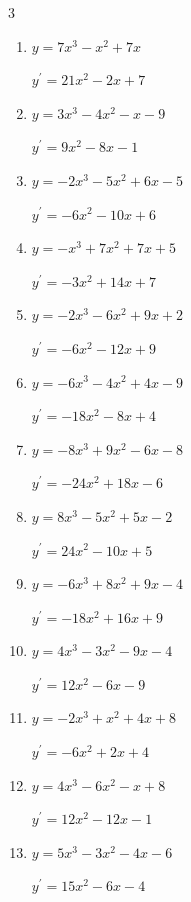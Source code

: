 \begin{multicols}{3}
\begin{enumerate}
  \item $y=7x^{3}-x^{2}+7x$

        $\displaystyle y^{\prime}=21x^{2}-2x+7$

  \item $y=3x^{3}-4x^{2}-x-9$

        $\displaystyle y^{\prime}=9x^{2}-8x-1$

\columnbreak %

  \item $y=-2x^{3}-5x^{2}+6x-5$

        $\displaystyle y^{\prime}=-6x^{2}-10x+6$

  \item $y=-x^{3}+7x^{2}+7x+5$

        $\displaystyle y^{\prime}=-3x^{2}+14x+7$

  \item $y=-2x^{3}-6x^{2}+9x+2$

        $\displaystyle y^{\prime}=-6x^{2}-12x+9$

  \item $y=-6x^{3}-4x^{2}+4x-9$

        $\displaystyle y^{\prime}=-18x^{2}-8x+4$

  \item $y=-8x^{3}+9x^{2}-6x-8$

        $\displaystyle y^{\prime}=-24x^{2}+18x-6$

  \item $y=8x^{3}-5x^{2}+5x-2$

        $\displaystyle y^{\prime}=24x^{2}-10x+5$

  \item $y=-6x^{3}+8x^{2}+9x-4$

        $\displaystyle y^{\prime}=-18x^{2}+16x+9$

  \item $y=4x^{3}-3x^{2}-9x-4$

        $\displaystyle y^{\prime}=12x^{2}-6x-9$

  \item $y=-2x^{3}+x^{2}+4x+8$

        $\displaystyle y^{\prime}=-6x^{2}+2x+4$

  \item $y=4x^{3}-6x^{2}-x+8$

        $\displaystyle y^{\prime}=12x^{2}-12x-1$

  \item $y=5x^{3}-3x^{2}-4x-6$

        $\displaystyle y^{\prime}=15x^{2}-6x-4$


\end{enumerate}
\end{multicols}
